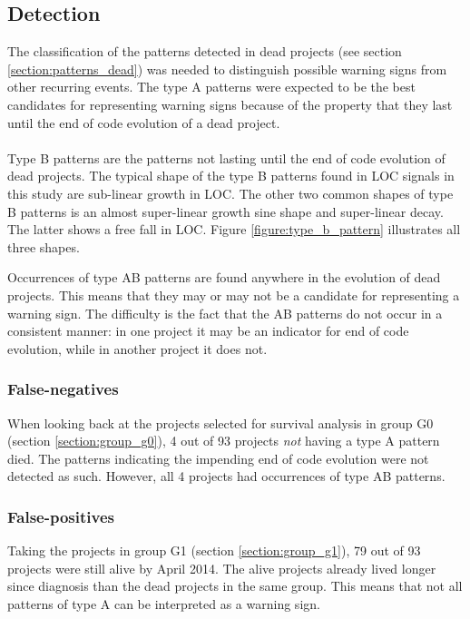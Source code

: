 \subsection{Detection}
The classification of the patterns detected in dead projects (see section
\ref{section:patterns_dead}) was needed to distinguish possible warning signs
from other recurring events. The type A patterns were expected to be the best
candidates for representing warning signs because of the property that they
last until the end of code evolution of a dead project.

\paragraph{}
Type B patterns are the patterns not lasting until the end of code evolution of
dead projects. The typical shape of the type B patterns found in LOC signals in
this study are sub-linear growth in LOC. The other two common shapes of type B
patterns is an almost super-linear growth sine shape and super-linear decay.
The latter shows a free fall in LOC. Figure \ref{figure:type_b_pattern}
illustrates all three shapes.



\noindent
Occurrences of type AB patterns are found anywhere in the evolution of dead
projects. This means that they may or may not be a candidate for representing a
warning sign. The difficulty is the fact that the AB patterns do not occur in a
consistent manner: in one project it may be an indicator for end of code
evolution, while in another project it does not.

\subsubsection{False-negatives}
When looking back at the projects selected for survival analysis in group G0
(section \ref{section:group_g0}), 4 out of 93 projects \textit{not} having a
type A pattern died. The patterns indicating the impending end of code
evolution were not detected as such. However, all 4 projects had occurrences of
type AB patterns.

\subsubsection{False-positives}
Taking the projects in group G1 (section \ref{section:group_g1}), 79 out of 93
projects were still alive by April 2014. The alive projects already lived
longer since diagnosis than the dead projects in the same group. This means
that not all patterns of type A can be interpreted as a warning sign.

